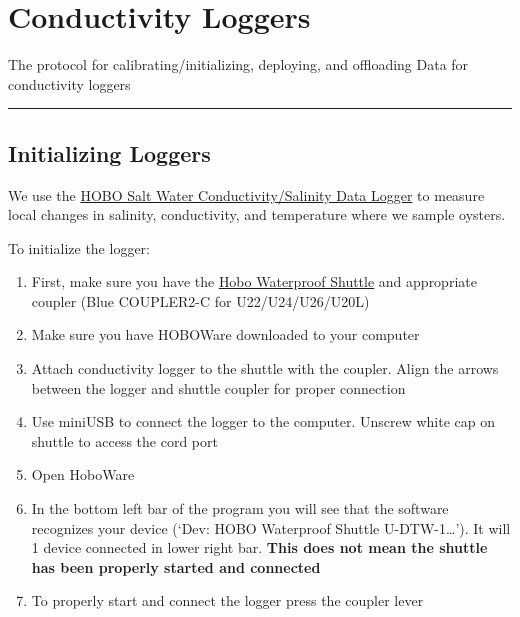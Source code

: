\documentclass[
  letterpaper,
  DIV=11,
  numbers=noendperiod]{scrreprt}
\begin{document}
\hypertarget{conductivity-loggers}{%
\chapter{Conductivity Loggers}\label{conductivity-loggers}}

The protocol for calibrating/initializing, deploying, and offloading
Data for conductivity loggers

\begin{center}\rule{0.5\linewidth}{0.5pt}\end{center}

\hypertarget{initializing-loggers}{%
\section*{\texorpdfstring{\textbf{Initializing
Loggers}}{Initializing Loggers}}\label{initializing-loggers}}


We use the
\href{http://www.onsetcomp.com/products/data-loggers/u24-002-c}{HOBO
Salt Water Conductivity/Salinity Data Logger} to measure local changes
in salinity, conductivity, and temperature where we sample oysters.

To initialize the logger:

\begin{enumerate}
\def\labelenumi{\arabic{enumi}.}
\item
  First, make sure you have the
  \href{http://www.onsetcomp.com/products/communications/u-dtw-1}{Hobo
  Waterproof Shuttle} and appropriate coupler (Blue COUPLER2-C for
  U22/U24/U26/U20L)
\item
  Make sure you have HOBOWare downloaded to your computer
\item
  Attach conductivity logger to the shuttle with the coupler. Align the
  arrows between the logger and shuttle coupler for proper connection
\item
  Use miniUSB to connect the logger to the computer. Unscrew white cap
  on shuttle to access the cord port
\item
  Open HoboWare
\item
  In the bottom left bar of the program you will see that the software
  recognizes your device (`Dev: HOBO Waterproof Shuttle
  U-DTW-1\ldots{}'). It will 1 device connected in lower right bar.
  \textbf{This does not mean the shuttle has been properly started and
  connected}
\item
  To properly start and connect the logger press the coupler lever
\end{enumerate}
\end{document}
